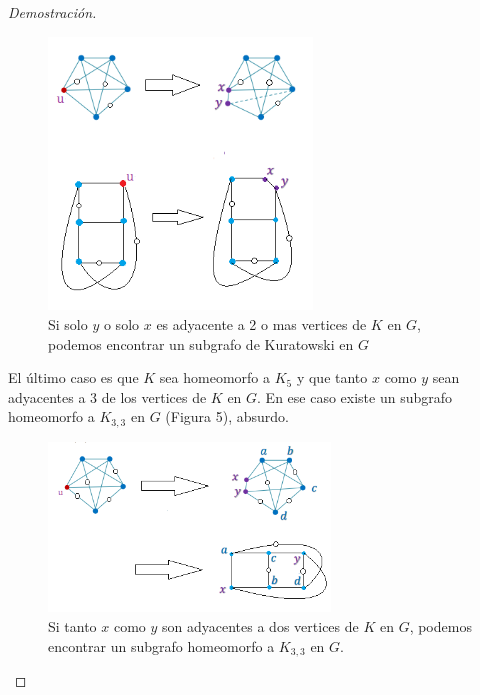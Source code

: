 \documentclass{article}
\begin{document}
\begin{proof}[Demostración]
\begin{figure}[htp]
\centering
\includegraphics[width=7cm]{img/kura6}
\caption{Si solo $y$ o solo $x$ es adyacente a 2 o mas vertices de $K$ en $G$, podemos encontrar un subgrafo de Kuratowski en $G$}
\label{fig:kura6}
\end{figure}

El último caso es que $K$ sea homeomorfo a $K_5$ y que tanto $x$ como $y$ sean adyacentes a 3 de los vertices de $K$ en $G$. En ese caso existe un subgrafo homeomorfo a $K_{3,3}$ en $G$ (Figura 5), absurdo.


\begin{figure}[htp]
\centering
\includegraphics[width=7.5cm]{img/kura7}
\caption{Si tanto $x$ como $y$ son adyacentes a dos vertices de $K$ en $G$, podemos encontrar un subgrafo homeomorfo a $K_{3,3}$ en $G$.}
\label{fig:kura6}
\end{figure}
\end{proof}
\end{document}
